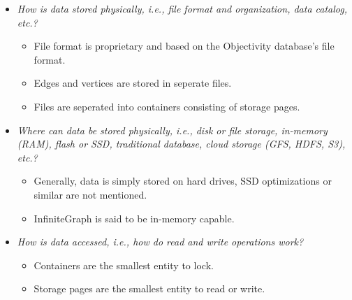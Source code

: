 
\begin{itemize}
\item \emph{How is data stored physically, i.e., file format and organization, data catalog, etc.?}
  \begin{itemize}
  \item File format is proprietary and based on the Objectivity database's file format.
  \item Edges and vertices are stored in seperate files.
  \item Files are seperated into containers consisting of storage pages.
  \end{itemize}
\item \emph{Where can data be stored physically, i.e., disk or file storage, in-memory (RAM), flash or SSD, traditional database, cloud storage (GFS, HDFS, S3), etc.?}
  \begin{itemize}
  \item Generally, data is simply stored on hard drives, SSD optimizations or similar are not mentioned.
  \item InfiniteGraph is said to be in-memory capable.
  \end{itemize}
\item \emph{How is data accessed, i.e., how do read and write operations work?}
  \begin{itemize}
  \item Containers are the smallest entity to lock.
  \item Storage pages are the smallest entity to read or write.
  \end{itemize}
\end{itemize}
